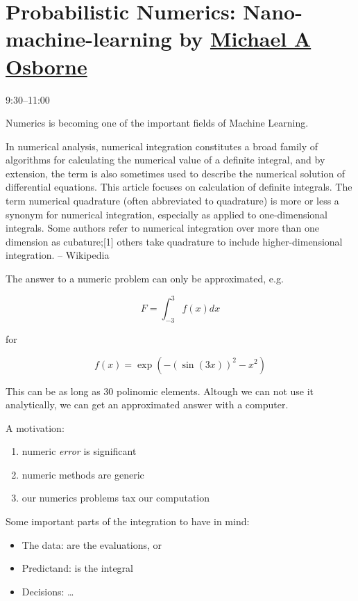 \chapter{Probabilistic Numerics: Nano-machine-learning by
\href{http://www.robots.ox.ac.uk/~mosb/}{Michael A Osborne}}

9:30--11:00

Numerics is becoming one of the important fields of Machine Learning.

\begin{mybox}
  In numerical analysis, numerical integration constitutes a broad family of
  algorithms for calculating the numerical value of a definite integral, and by
  extension, the term is also sometimes used to describe the numerical solution
  of differential equations. This article focuses on calculation of definite
  integrals. The term numerical quadrature (often abbreviated to quadrature) is
  more or less a synonym for numerical integration, especially as applied to
  one-dimensional integrals. Some authors refer to numerical integration over
  more than one dimension as cubature;[1] others take quadrature to include
  higher-dimensional integration. -- Wikipedia
\end{mybox}

The answer to a numeric problem can only be approximated, e.g.

\begin{equation}
  F = \int_{-3}^3 f(x) dx
\end{equation}

for

\begin{equation}
  f(x) = \exp(-(\sin(3x))^2 - x^2)
\end{equation}

This can be as long as 30 polinomic elements. Altough we can not use it
analytically, we can get an approximated answer with a computer.

A motivation:

\begin{enumerate}
  \item numeric \emph{error} is significant
  \item numeric methods are generic
  \item our numerics problems tax our computation
\end{enumerate}

Some important parts of the integration to have in mind:

\begin{itemize}
  \item The data: are the evaluations, or
  \item Predictand: is the integral
  \item Decisions: \dots
\end{itemize}

